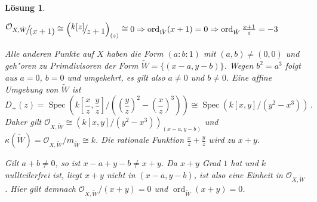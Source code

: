 \documentclass[paper = A4, fontsize=12pt, numbers=noendperiod, chapterprefix=true]{scrbook}
\theoremstyle{break}
\newtheorem{Loes}{L\"osung}
\theoremstyle{nonumberbreak}
\theoremstyle{nonumberplain}
\DeclareMathOperator{\Spec}{Spec}
\DeclareMathOperator{\ddiv}{div}
\DeclareMathOperator{\ord}{ord}
\newcommand{\calK}{\mathcal{K}}
\newcommand{\calO}{\mathcal{O}}
\newcommand{\FakRaum}[2]{
	\raisebox{0.7ex}{\ensuremath{#1}}
	\ensuremath{\mkern-3mu}\big/\ensuremath{\mkern-3mu}
	\raisebox{-0.6ex}{\ensuremath{#2}}}
\begin{document}
\begin{Loes}
\begin{enumerate}[a)]
	$\FakRaum{\calO_{X,\hat W}}{(x+1)} \cong \left( \FakRaum{k[z]}{z+1} \right)_{(z)} \cong 0 \Rightarrow \ord_{\hat W} (x+1) = 0 \Rightarrow \ord_{\hat W} \frac{x+1}{z} = -3$
	
	
% 	

  Alle anderen Punkte auf $X$ haben die Form $(a\!:\!b\!:\!1)$ mit $(a,b) \neq (0,0)$ und geh"oren zu Primdivisoren der Form $\widetilde{W} = \{(x-a, y-b)\}$. Wegen $b^2 = a^3$ folgt aus $a= 0$, $b=0$ und umgekehrt, es gilt also $a \neq0$ und $b \neq 0$. 
  Eine affine Umgebung von $\widetilde{W}$ ist 
  $$D_+(z) = \Spec\left(k\left[\frac{x}{z}, \frac{y}{z}\right]/\left(\left(\frac{y}{z}\right)^2-\left(\frac{x}{z} \right)^3\right) \right) \cong \Spec\left(k[x,y]/(y^2-x^3)\right)\,.$$ 
  Daher gilt $\calO_{X,\widetilde{W}} \cong \left(k[x,y]/(y^2-x^3)\right)_{(x-a,y-b)}$ und $\kappa(\widetilde{W}) = \calO_{X,\widetilde{W}} / m_{\widetilde{W}} \cong k$. Die rationale Funktion $\frac{x}{z}+\frac{y}{z}$ wird zu $x+y$.

  Gilt $a + b \neq 0$, so ist $x - a + y - b \neq x+y$. Da $x+y$ Grad $1$ hat und $k$ nullteilerfrei ist, liegt $x+y$ nicht in $(x-a,y-b)$, ist also eine Einheit in $\calO_{X,\widetilde{W}}$. Hier gilt demnach $\calO_{X,\widetilde{W}}/(x+y) = 0$ und $\ord_{\widetilde{W}} (x+y) = 0$.


\end{enumerate}
\end{Loes}
\end{document}
